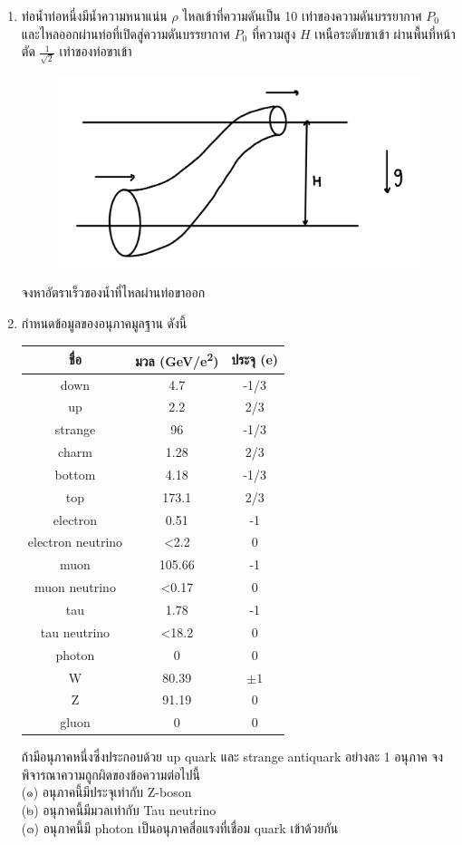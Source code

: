 \documentclass[a4paper,12pt]{article}
\begin{document}
\begin{enumerate}
		\item ท่อน้ำท่อหนึ่งมีน้ำความหนาแน่น \(\rho\) ไหลเข้าที่ความดันเป็น 10 เท่าของความดันบรรยากาศ \(P_0\) และไหลออกผ่านท่อที่เปิดสู่ความดันบรรยากาศ \(P_0\) ที่ความสูง \(H\) เหนือระดับขาเข้า ผ่านพื้นที่หน้าตัด \(\frac{1}{\sqrt{2}}\) เท่าของท่อขาเข้า 
		\begin{figure}[h]
			\centering
			\includegraphics[width=0.5\linewidth]{22}
		\end{figure}จงหาอัตราเร็วของน้ำที่ไหลผ่านท่อขาออก
			\vspace{4cm}	
\newpage		
		\item กำหนดข้อมูลของอนุภาคมูลฐาน ดังนี้\\
		\begin{center}

		\begin{tabular}{|c|c|c|}
			\hline
			ชื่อ & มวล (\si{GeV/e^2}) & ประจุ (\si{e}) \\
			\hline
			down & 4.7 & -1/3 \\
			\hline
			up & 2.2 & 2/3 \\
			\hline
			strange & 96 & -1/3 \\
			\hline
			charm & 1.28 & 2/3 \\
			\hline
			bottom & 4.18 & -1/3 \\
			\hline
			top & 173.1 & 2/3 \\
			\hline
			electron & 0.51 & -1 \\
			\hline
			electron neutrino & <2.2 & 0 \\
			\hline
			muon & 105.66 & -1 \\
			\hline
			muon neutrino & <0.17 & 0 \\
			\hline
			tau & 1.78 & -1 \\
			\hline
			tau neutrino & <18.2 & 0 \\
			\hline
			photon & 0 & 0 \\
			\hline
			W & 80.39 & \(\pm1\) \\
			\hline
			Z & 91.19 & 0 \\
			\hline
			gluon & 0 & 0 \\
			\hline
		\end{tabular}
		\end{center}
		ถ้ามีอนุภาคหนึ่งซึ่งประกอบด้วย up quark และ strange antiquark อย่างละ  1 อนุภาค จงพิจารณาความถูกผิดของข้อความต่อไปนี้\\
		(๑\textenglish{)} อนุภาคนี้มีประจุเท่ากับ Z-boson\\
		(๒\textenglish{)} อนุภาคนี้มีมวลเท่ากับ Tau neutrino\\
		(๓\textenglish{)} อนุภาคนี้มี photon เป็นอนุภาคสื่อแรงที่เชื่อม quark เข้าด้วยกัน
			\vspace{4cm}
		

\end{enumerate}
\end{document}
